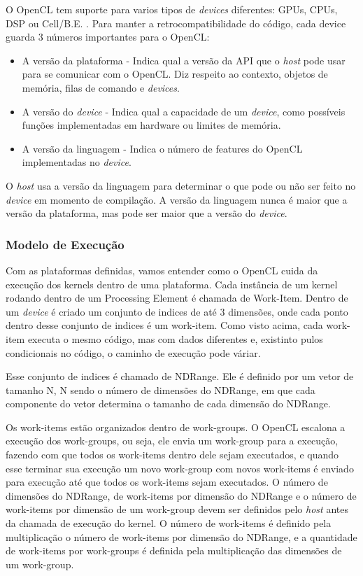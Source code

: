 O OpenCL tem suporte para varios tipos de \textit{devices} diferentes: GPUs, CPUs, DSP ou Cell/B.E. .
Para manter a retrocompatibilidade do código, cada device guarda 3 números importantes para o OpenCL:
\begin{itemize} 
  \item A versão da plataforma - Indica qual a versão da API que o \textit{host} pode usar para se comunicar com o OpenCL.
        Diz respeito ao contexto, objetos de memória, filas de comando e \textit{devices}.
  \item A versão do \textit{device} - Indica qual a capacidade de um \textit{device}, como possíveis funções implementadas
        em hardware ou limites de memória.
  \item A versão da linguagem - Indica o número de features do OpenCL implementadas no \textit{device}.
\end{itemize}

O \textit{host} usa a versão da linguagem para determinar o que pode ou não ser feito no \textit{device} em momento de compilação.
A versão da linguagem nunca é maior que a versão da plataforma, mas pode ser maior que a versão do \textit{device}.

\subsubsection{Modelo de Execução}

Com as plataformas definidas, vamos entender como o OpenCL cuida da execução dos kernels dentro de uma plataforma.
Cada instância de um kernel rodando dentro de um Processing Element é chamada de Work-Item. Dentro de um \textit{device}
é criado um conjunto de indices de até 3 dimensões, onde cada ponto dentro desse conjunto de indices é um work-item. 
Como visto acima, cada work-item executa o mesmo código, mas com dados diferentes e, existinto pulos condicionais no código, 
o caminho de execução pode váriar.

Esse conjunto de indices é chamado de NDRange. Ele é definido por um vetor de tamanho N, N sendo o número de dimensões do
NDRange, em que cada componente do vetor determina o tamanho de cada dimensão do NDRange. 

Os work-items estão organizados dentro de work-groups. O OpenCL escalona a execução dos work-groups, ou seja, ele envia um 
work-group para a execução, fazendo com que todos os work-items dentro dele sejam executados, e quando esse terminar sua 
execução um novo work-group com novos work-items é enviado para execução até que todos os work-items sejam executados. 
O número de dimensões do NDRange, de work-items por dimensão do NDRange e o número de work-items por dimensão de um work-group
devem ser definidos pelo \textit{host} antes da chamada de execução do kernel. O número de work-items é definido pela multiplicação
o número de work-items por dimensão do NDRange, e a quantidade de work-items por work-groups é definida pela multiplicação das dimensões
de um work-group.

